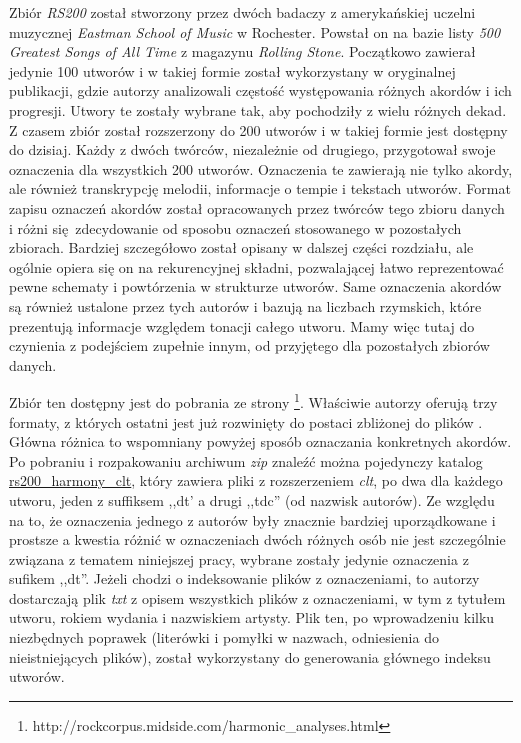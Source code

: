 Zbiór \emph{RS200} \cite{de_clercq_corpus_2011} został stworzony przez dwóch badaczy z amerykańskiej
uczelni muzycznej \emph{Eastman School of Music} w Rochester. Powstał on na bazie listy \emph{500
Greatest Songs of All Time} z magazynu \emph{Rolling Stone}. Początkowo zawierał jedynie 100 utworów i w
takiej formie został wykorzystany w oryginalnej publikacji, gdzie autorzy analizowali częstość
występowania różnych akordów i ich progresji. Utwory te zostały wybrane tak, aby pochodziły z wielu
różnych dekad. Z czasem zbiór został rozszerzony do 200 utworów i w takiej formie jest dostępny do
dzisiaj. Każdy z dwóch twórców, niezależnie od drugiego, przygotował swoje oznaczenia dla wszystkich
200 utworów. Oznaczenia te zawierają nie tylko akordy, ale również transkrypcję melodii, informacje
o tempie i tekstach utworów. Format zapisu oznaczeń akordów został opracowanych przez twórców tego
zbioru danych i różni się zdecydowanie od sposobu oznaczeń stosowanego w pozostałych zbiorach.
Bardziej szczegółowo został opisany w dalszej części rozdziału, ale ogólnie opiera się on na
rekurencyjnej składni, pozwalającej łatwo reprezentować pewne schematy i powtórzenia w strukturze
utworów. Same oznaczenia akordów są również ustalone przez tych autorów i bazują na liczbach
rzymskich, które prezentują informacje względem tonacji całego utworu. Mamy więc tutaj do
czynienia z podejściem zupełnie innym, od przyjętego dla pozostałych zbiorów danych.

Zbiór ten dostępny jest do pobrania ze strony
\footnote{http://rockcorpus.midside.com/harmonic\_analyses.html}. Właściwie autorzy oferują trzy
formaty, z których ostatni jest już rozwinięty do postaci zbliżonej do plików . Główna
różnica to wspomniany powyżej sposób oznaczania konkretnych akordów. Po pobraniu i rozpakowaniu archiwum
\emph{zip} znaleźć można pojedynczy katalog \url{rs200\_harmony\_clt}, który zawiera pliki z
rozszerzeniem \emph{clt}, po dwa dla każdego utworu, jeden z suffiksem ,,dt' a drugi ,,tdc'' (od
nazwisk autorów). Ze względu na to, że oznaczenia jednego z autorów były znacznie bardziej
uporządkowane i prostsze a kwestia różnić w oznaczeniach dwóch różnych osób nie jest szczególnie
związana z tematem niniejszej pracy, wybrane zostały jedynie oznaczenia z sufikem ,,dt''. Jeżeli
chodzi o indeksowanie plików z oznaczeniami, to autorzy dostarczają plik \emph{txt} z opisem
wszystkich plików z oznaczeniami, w tym z tytułem utworu, rokiem wydania i nazwiskiem artysty. Plik
ten, po wprowadzeniu kilku niezbędnych poprawek (literówki i pomyłki w nazwach, odniesienia do
nieistniejących plików), został wykorzystany do generowania głównego indeksu utworów.

